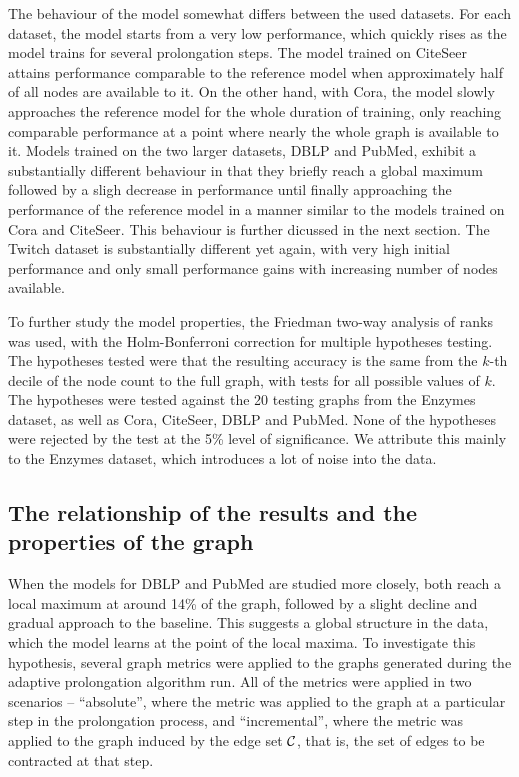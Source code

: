 The behaviour of the model somewhat differs between the used datasets. For each dataset, the model starts from a very low performance, which quickly rises as the model trains for several prolongation steps. The model trained on CiteSeer attains performance comparable to the reference model when approximately half of all nodes are available to it. On the other hand, with Cora, the model slowly approaches the reference model for the whole duration of training, only reaching comparable performance at a point where nearly the whole graph is available to it. Models trained on the two larger datasets, DBLP and PubMed, exhibit a substantially different behaviour in that they briefly reach a global maximum followed by a sligh decrease in performance until finally approaching the performance of the reference model in a manner similar to the models trained on Cora and CiteSeer. This behaviour is further dicussed in the next section. The Twitch dataset is substantially different yet again, with very high initial performance and only small performance gains with increasing number of nodes available.

To further study the model properties, the Friedman two-way analysis of ranks was used, with the Holm-Bonferroni correction for multiple hypotheses testing. The hypotheses tested were that the resulting accuracy is the same from the \( k \)-th decile of the node count to the full graph, with tests for all possible values of \( k \). The hypotheses were tested against the 20 testing graphs from the Enzymes dataset, as well as Cora, CiteSeer, DBLP and PubMed. None of the hypotheses were rejected by the test at the 5\% level of significance. We attribute this mainly to the Enzymes dataset, which introduces a lot of noise into the data.

\subsection{The relationship of the results and the properties of the graph}

When the models for DBLP and PubMed are studied more closely, both reach a local maximum at around 14\% of the graph, followed by a slight decline and gradual approach to the baseline. This suggests a global structure in the data, which the model learns at the point of the local maxima. To investigate this hypothesis, several graph metrics were applied to the graphs generated during the adaptive prolongation algorithm run. All of the metrics were applied in two scenarios -- \enquote{absolute}, where the metric was applied to the graph at a particular step in the prolongation process, and \enquote{incremental}, where the metric was applied to the graph induced by the edge set \( \mathcal{C} \), that is, the set of edges to be contracted at that step.


